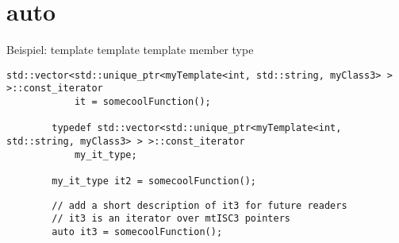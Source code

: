 \section{auto}

\begin{frame}[fragile]{Beispiel: template template template member type}
	\begin{lstlisting}[basicstyle=\tiny]
		std::vector<std::unique_ptr<myTemplate<int, std::string, myClass3> > >::const_iterator
		    it = somecoolFunction();
		
		typedef std::vector<std::unique_ptr<myTemplate<int, std::string, myClass3> > >::const_iterator 
		    my_it_type;
		    
		my_it_type it2 = somecoolFunction();
	\end{lstlisting}
	\begin{lstlisting}
		// add a short description of it3 for future readers
		// it3 is an iterator over mtISC3 pointers
		auto it3 = somecoolFunction();
	\end{lstlisting}
\end{frame}
